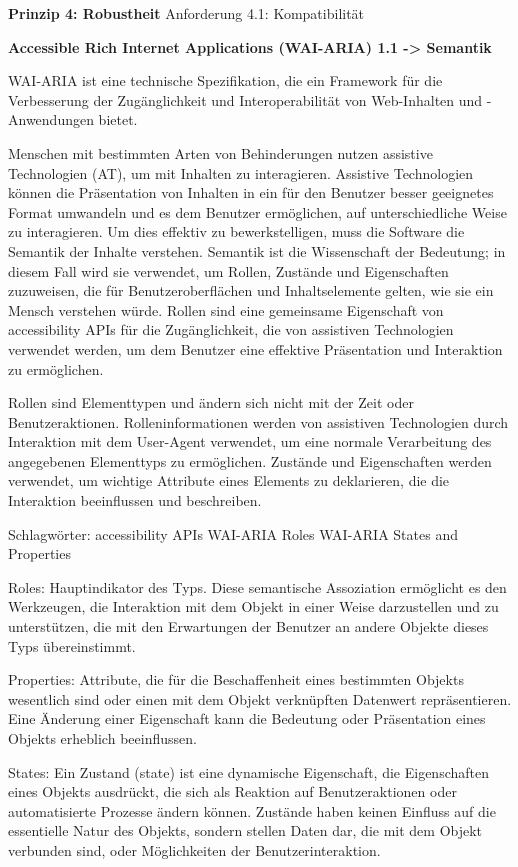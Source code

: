 \textbf{Prinzip 4: Robustheit}
Anforderung 4.1: Kompatibilität


\textbf{Accessible Rich Internet Applications (WAI-ARIA) 1.1 -> Semantik}

WAI-ARIA ist eine technische Spezifikation, die ein Framework für die Verbesserung der Zugänglichkeit und Interoperabilität von Web-Inhalten und -Anwendungen bietet.

Menschen mit bestimmten Arten von Behinderungen nutzen assistive Technologien (AT), um mit Inhalten zu interagieren. Assistive Technologien können die Präsentation von Inhalten in ein für den Benutzer besser geeignetes Format umwandeln und es dem Benutzer ermöglichen, auf unterschiedliche Weise zu interagieren. Um dies effektiv zu bewerkstelligen, muss die Software die Semantik der Inhalte verstehen. Semantik ist die Wissenschaft der Bedeutung; in diesem Fall wird sie verwendet, um Rollen, Zustände und Eigenschaften zuzuweisen, die für Benutzeroberflächen und Inhaltselemente gelten, wie sie ein Mensch verstehen würde. Rollen sind eine gemeinsame Eigenschaft von accessibility APIs für die Zugänglichkeit, die von assistiven Technologien verwendet werden, um dem Benutzer eine effektive Präsentation und Interaktion zu ermöglichen.

Rollen sind Elementtypen und ändern sich nicht mit der Zeit oder Benutzeraktionen. Rolleninformationen werden von assistiven Technologien durch Interaktion mit dem User-Agent verwendet, um eine normale Verarbeitung des angegebenen Elementtyps zu ermöglichen. Zustände und Eigenschaften werden verwendet, um wichtige Attribute eines Elements zu deklarieren, die die Interaktion beeinflussen und beschreiben. 

Schlagwörter:
accessibility APIs
WAI-ARIA Roles
WAI-ARIA States and Properties

Roles:
Hauptindikator des Typs. Diese semantische Assoziation ermöglicht es den Werkzeugen, die Interaktion mit dem Objekt in einer Weise darzustellen und zu unterstützen, die mit den Erwartungen der Benutzer an andere Objekte dieses Typs übereinstimmt.

Properties:
Attribute, die für die Beschaffenheit eines bestimmten Objekts wesentlich sind oder einen mit dem Objekt verknüpften Datenwert repräsentieren. Eine Änderung einer Eigenschaft kann die Bedeutung oder Präsentation eines Objekts erheblich beeinflussen.


States:
Ein Zustand (state) ist eine dynamische Eigenschaft, die Eigenschaften eines Objekts ausdrückt, die sich als Reaktion auf Benutzeraktionen oder automatisierte Prozesse ändern können. Zustände haben keinen Einfluss auf die essentielle Natur des Objekts, sondern stellen Daten dar, die mit dem Objekt verbunden sind, oder Möglichkeiten der Benutzerinteraktion.

